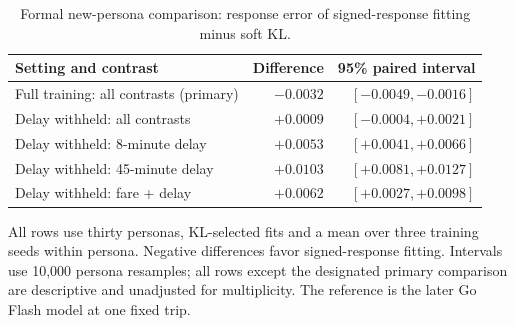 
\begin{table}[pos=htbp]
\caption{Formal new-persona comparison: response error of signed-response fitting minus soft KL.}\label{tab:primary_results}
\small\begin{tabularx}{\linewidth}{@{}Xrr@{}}\toprule
Setting and contrast & Difference & 95\% paired interval \\\midrule
Full training: all contrasts (primary) & $-0.0032$ & $[-0.0049, -0.0016]$ \\
Delay withheld: all contrasts & $+0.0009$ & $[-0.0004, +0.0021]$ \\
Delay withheld: 8-minute delay & $+0.0053$ & $[+0.0041, +0.0066]$ \\
Delay withheld: 45-minute delay & $+0.0103$ & $[+0.0081, +0.0127]$ \\
Delay withheld: fare + delay & $+0.0062$ & $[+0.0027, +0.0098]$ \\
\bottomrule\end{tabularx}
\par\smallskip\footnotesize All rows use thirty personas, KL-selected fits and a mean over three training seeds within persona. Negative differences favor signed-response fitting. Intervals use 10,000 persona resamples; all rows except the designated primary comparison are descriptive and unadjusted for multiplicity. The reference is the later Go Flash model at one fixed trip.
\end{table}
